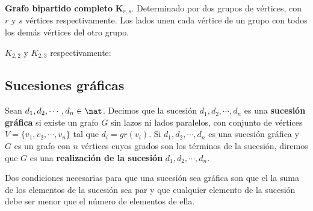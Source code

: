 \begin{ndef}
    \textbf{Grafo bipartido completo} \textbf{K$_{r,s}$}. Determinado por dos grupos de vértices, con $r$ y $s$ vértices respectivamente. Los lados unen cada vértice de un grupo con todos los demás vértices del otro grupo.
\end{ndef}
\begin{ejemplo} $K_{2,2}$ y $K_{2,3}$ respectivamente:
    \begin{center}
        \quad\quad\quad\quad
    \end{center}
\end{ejemplo}

\subsection{Sucesiones gráficas}
\begin{ndef}
    Sean $d_1,d_2,\cdots,d_n \in \nat$. Decimos que la sucesión $d_1,d_2,\cdots,d_n$ es una \textbf{sucesión gráfica} si existe un grafo $G$
    sin lazos ni lados paralelos, con conjunto de vértices $V = \{v_1,v_2,\cdots,v_n\}$ tal que $d_i = gr(v_i)$.
    Si $d_1,d_2,\cdots,d_n$ es una sucesión gráfica y $G$ es un grafo con $n$ vértices cuyos grados son los términos de la sucesión, diremos que $G$ es una \textbf{realización de la sucesión} $d_1,d_2,\cdots,d_n$.
\end{ndef}
\begin{obs}
    Dos condiciones necesarias para que una sucesión sea gráfica son que el la suma de los elementos de la sucesión sea par y que cualquier elemento de la sucesión debe ser menor que el número de elementos de ella.
\end{obs}

